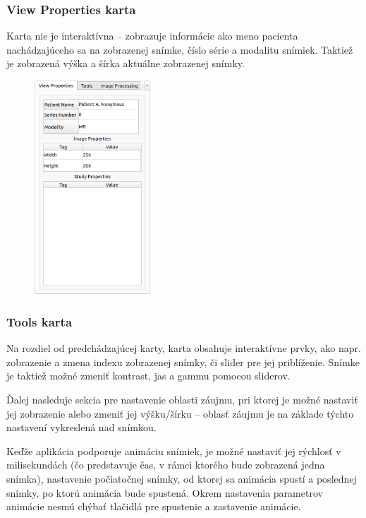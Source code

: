 {\subsubsection {View Properties karta}
Karta  nie je interaktívna -- zobrazuje informácie ako meno pacienta nachádzajúceho sa na zobrazenej snímke, číslo série a modalitu snímiek. Taktiež je zobrazená výška a šírka aktuálne zobrazenej snímky.

\begin {figure}[H]
        \centering
        \includegraphics[height=8cm]{media/existing_app/tabs/view_properties.png}
        \captionsetup{justification=centering}
\end {figure}

\clearpage

\subsubsection {Tools karta}
Na rozdiel od predchádzajúcej karty,  karta obsahuje interaktívne prvky, ako napr. zobrazenie a zmena indexu zobrazenej snímky, či slider pre jej priblíženie. Snímke je taktiež možné zmeniť kontrast, jas a gammu pomocou sliderov.

Ďalej nasleduje sekcia pre nastavenie oblasti záujmu, pri ktorej je možné nastaviť jej zobrazenie alebo zmeniť jej výšku/šírku -- oblasť záujmu je na základe týchto nastavení vykreslená nad snímkou. 

Keďže aplikácia podporuje animáciu snímiek, je možné nastaviť jej rýchlosť v milisekundách (čo predstavuje čas, v rámci ktorého bude zobrazená jedna snímka), nastavenie počiatočnej snímky, od ktorej sa animácia spustí a poslednej snímky, po ktorú animácia bude spustená. Okrem nastavenia parametrov animácie nesmú chýbať tlačidlá pre spustenie a zastavenie animácie.

}
